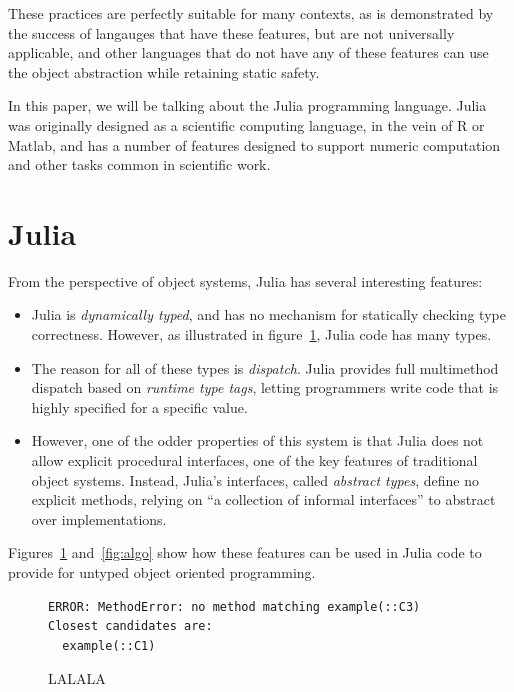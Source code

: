 \documentclass[preprint]{sigplanconf}
\begin{document}
These practices are perfectly suitable for many contexts,
as is demonstrated by the success of langauges that have 
these features, but are not universally applicable, and
other languages that do not have any of these features
can use the object abstraction while retaining static 
safety.

In this paper, we will be talking about the Julia
programming language. Julia was originally designed
as a scientific computing language, in the vein of 
R or Matlab, and has a number of features designed
to support numeric computation and other tasks common
in scientific work.

\section{Julia}

From the perspective of object systems, Julia has several interesting features:
\begin{itemize}
\item Julia is \emph{dynamically typed}, and has no mechanism for statically
checking type correctness. However, as illustrated in figure~\ref{code:broken},
Julia code has many types.
\item The reason for all of these types is \emph{dispatch}. Julia provides 
full multimethod dispatch based on \emph{runtime type tags}, letting programmers
write code that is highly specified for a specific value.
\item However, one of the odder properties of this system is that Julia does not
allow explicit procedural interfaces, one of the key features of traditional 
object systems. Instead, Julia's interfaces, called \emph{abstract types}, 
define no explicit methods, relying on ``a collection of informal interfaces''
\cite{juliadocu} to abstract over implementations.
\end{itemize}

Figures~\ref{code:broken} and~\ref{fig:algo} show how these features can be used
in Julia code to provide for untyped object oriented programming. 

\begin{figure}


\begin{Verbatim}[fontsize=\small]
ERROR: MethodError: no method matching example(::C3)
Closest candidates are:
  example(::C1)
\end{Verbatim}
\caption{LALALA}
\label{code:broken}
\end{figure}
\end{document}
